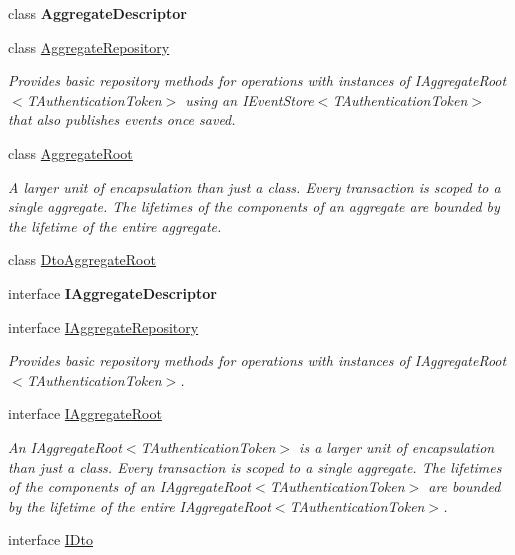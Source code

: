 \begin{DoxyCompactItemize}
\item 
class {\bfseries Aggregate\+Descriptor}
\item 
class \hyperlink{classCqrs_1_1Domain_1_1AggregateRepository}{Aggregate\+Repository}
\begin{DoxyCompactList}\small\item\em Provides basic repository methods for operations with instances of I\+Aggregate\+Root$<$\+T\+Authentication\+Token$>$ using an I\+Event\+Store$<$\+T\+Authentication\+Token$>$ that also publishes events once saved. \end{DoxyCompactList}\item 
class \hyperlink{classCqrs_1_1Domain_1_1AggregateRoot}{Aggregate\+Root}
\begin{DoxyCompactList}\small\item\em A larger unit of encapsulation than just a class. Every transaction is scoped to a single aggregate. The lifetimes of the components of an aggregate are bounded by the lifetime of the entire aggregate. \end{DoxyCompactList}\item 
class \hyperlink{classCqrs_1_1Domain_1_1DtoAggregateRoot}{Dto\+Aggregate\+Root}
\item 
interface {\bfseries I\+Aggregate\+Descriptor}
\item 
interface \hyperlink{interfaceCqrs_1_1Domain_1_1IAggregateRepository}{I\+Aggregate\+Repository}
\begin{DoxyCompactList}\small\item\em Provides basic repository methods for operations with instances of I\+Aggregate\+Root$<$\+T\+Authentication\+Token$>$. \end{DoxyCompactList}\item 
interface \hyperlink{interfaceCqrs_1_1Domain_1_1IAggregateRoot}{I\+Aggregate\+Root}
\begin{DoxyCompactList}\small\item\em An I\+Aggregate\+Root$<$\+T\+Authentication\+Token$>$ is a larger unit of encapsulation than just a class. Every transaction is scoped to a single aggregate. The lifetimes of the components of an I\+Aggregate\+Root$<$\+T\+Authentication\+Token$>$ are bounded by the lifetime of the entire I\+Aggregate\+Root$<$\+T\+Authentication\+Token$>$. \end{DoxyCompactList}\item 
interface \hyperlink{interfaceCqrs_1_1Domain_1_1IDto}{I\+Dto}

\end{DoxyCompactItemize}
